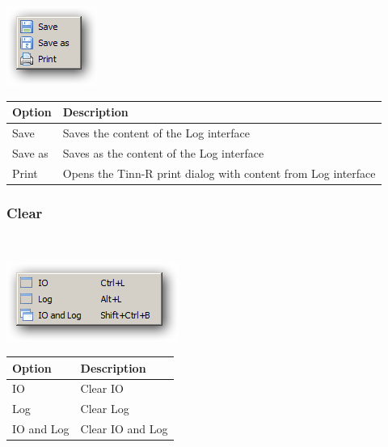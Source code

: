 \includegraphics[scale=0.50]{./res/menu_r_rterm_file_IOandLog.png}\\

\begin{scriptsize}\begin{tabularx}{\textwidth}{>{\hsize=0.3\hsize}X>{\hsize=0.7\hsize}X}\\
    \hline
    \textbf{Option} & \textbf{Description} \\
    \hline
    Save & Saves the content of the Log interface \\
    Save as & Saves as the content of the Log interface \\
    Print & Opens the Tinn-R print dialog with content from Log interface \\
    \hline
  \end{tabularx}\end{scriptsize}


\hypertarget{menu_r_rterm_clear}{}
\subsubsection{Clear}\\

\includegraphics[scale=0.50]{./res/menu_r_rterm_clear.png}\\

\begin{scriptsize}\begin{tabularx}{\textwidth}{>{\hsize=0.3\hsize}X>{\hsize=0.7\hsize}X}\\
    \hline
    \textbf{Option} & \textbf{Description} \\
    \hline
    IO & Clear IO \\
    Log & Clear Log \\
    IO and Log & Clear IO and Log \\
    \hline
  \end{tabularx}\end{scriptsize}


